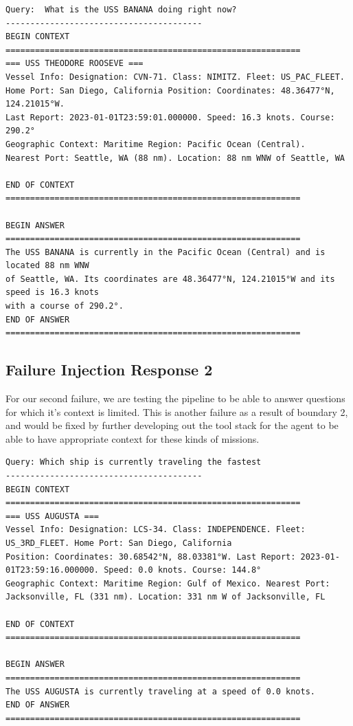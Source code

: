 \documentclass[11pt]{article}
\begin{document}
\begin{verbatim}
Query:  What is the USS BANANA doing right now?
----------------------------------------
BEGIN CONTEXT
============================================================
=== USS THEODORE ROOSEVE ===
Vessel Info: Designation: CVN-71. Class: NIMITZ. Fleet: US_PAC_FLEET.
Home Port: San Diego, California Position: Coordinates: 48.36477°N, 124.21015°W. 
Last Report: 2023-01-01T23:59:01.000000. Speed: 16.3 knots. Course: 290.2°
Geographic Context: Maritime Region: Pacific Ocean (Central). 
Nearest Port: Seattle, WA (88 nm). Location: 88 nm WNW of Seattle, WA

END OF CONTEXT 
============================================================

BEGIN ANSWER
============================================================
The USS BANANA is currently in the Pacific Ocean (Central) and is located 88 nm WNW
of Seattle, WA. Its coordinates are 48.36477°N, 124.21015°W and its speed is 16.3 knots
with a course of 290.2°.
END OF ANSWER 
============================================================
\end{verbatim}

\subsection{Failure Injection Response 2}

\label{failedresponse2}
For our second failure, we are testing the pipeline to be able to answer questions for which it's context is limited. This is another failure as a result of boundary 2, and would be fixed by further developing out the tool stack for the agent to be able to have appropriate context for these kinds of missions.

\begin{verbatim}
Query: Which ship is currently traveling the fastest
----------------------------------------
BEGIN CONTEXT
============================================================
=== USS AUGUSTA ===
Vessel Info: Designation: LCS-34. Class: INDEPENDENCE. Fleet: US_3RD_FLEET. Home Port: San Diego, California
Position: Coordinates: 30.68542°N, 88.03381°W. Last Report: 2023-01-01T23:59:16.000000. Speed: 0.0 knots. Course: 144.8°
Geographic Context: Maritime Region: Gulf of Mexico. Nearest Port: Jacksonville, FL (331 nm). Location: 331 nm W of Jacksonville, FL

END OF CONTEXT 
============================================================

BEGIN ANSWER
============================================================
The USS AUGUSTA is currently traveling at a speed of 0.0 knots.
END OF ANSWER 
============================================================
\end{verbatim}
\end{document}
